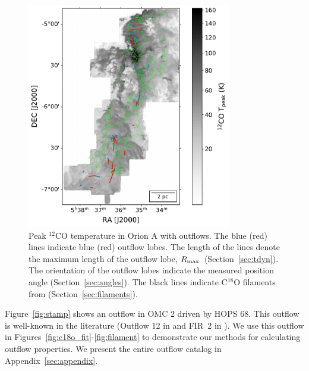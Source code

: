 \documentclass[twocolumn]{aastex63}
\newcommand{\example}{HOPS 68}
\newcommand{\co}[1][]{\ensuremath{^{#1}}CO}
\begin{document}
\begin{figure}
\centering
\includegraphics[width=0.8\textwidth]{overview.pdf}
\caption{Peak \co[12]{} temperature in Orion A with outflows. The blue (red) lines indicate blue (red) outflow lobes. The length of the lines denote the maximum length of the outflow lobe, $R_{\rm max}$~(Section~\ref{sec:tdyn}). The orientation of the outflow lobes indicate the measured position angle (Section~\ref{sec:angles}). The black lines indicate C$^{18}$O filaments from \citet{Suri19} (Section~\ref{sec:filaments}). \label{fig:overview}}
\end{figure}

Figure~\ref{fig:stamp} shows an outflow in OMC 2 driven by \example{}. This outflow is well-known in the literature (Outflow 12 in \citealp{Tanabe:submitted} and FIR~2 in \citealp{Takahashi08}). We use this outflow in Figures~\ref{fig:c18o_fit}-\ref{fig:filament} to demonstrate our methods for calculating outflow properties. We present the entire outflow catalog in Appendix~\ref{sec:appendix}.

\end{document}
